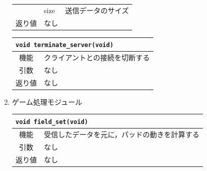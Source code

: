 \documentclass{jarticle}
\begin{document}
\begin{enumerate}
\begin{table}[H]
\begin{center}
\begin{tabular}{|c|p{3em}p{30em}|}
          & size & 送信データのサイズ\\
          返り値 & なし & \\ \hline
        \end{tabular}
      \end{center}
    \end{table}
%
    \begin{table}[H]
      \begin{center}
        \begin{tabular}{|c|p{3em}p{30em}|} \hline
          \multicolumn{3}{|l|}{{\tt void terminate\_server(void)}}\\ \hline \hline
          機能 & \multicolumn{2}{|l|}{クライアントとの接続を切断する}\\
          引数 & なし & \\
          返り値 & なし & \\ \hline
        \end{tabular}
      \end{center}
    \end{table}
%
\item ゲーム処理モジュール
      \begin{table}[H]
        \begin{center}
          \begin{tabular}{|c|p{3em}p{30em}|} \hline
            \multicolumn{3}{|l|}{{\tt void field\_set(void)}}\\ \hline \hline
            機能 & \multicolumn{2}{|l|}{受信したデータを元に，パッドの動きを計算する}\\
            引数 & なし & \\
            返り値 & なし & \\ \hline
          \end{tabular}
        \end{center}
      \end{table}
\end{enumerate}
%
\end{document}
